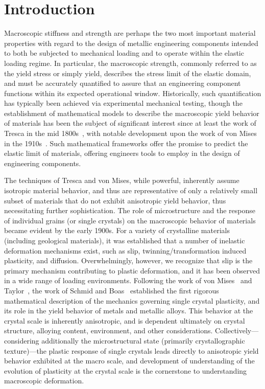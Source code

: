 \documentclass[preprint,3p,times,sort&compress,letterpaper,12pt]{elsarticle} %
\begin{document}

\section{Introduction}
\label{sec:introduction}

Macroscopic stiffness and strength are perhaps the two most important material properties with regard to the design of metallic engineering components intended to both be subjected to mechanical loading and to operate within the elastic loading regime. In particular, the macroscopic strength, commonly referred to as the yield stress or simply yield, describes the stress limit of the elastic domain, and must be accurately quantified to assure that an engineering component functions within its expected operational window. Historically, such quantification has typically been achieved via experimental mechanical testing, though the establishment of mathematical models to describe the macroscopic yield behavior of materials has been the subject of significant interest since at least the work of Tresca in the mid 1800s~\cite{Tresca}, with notable development upon the work of von Mises in the 1910s~\cite{Mises1913}. Such mathematical frameworks offer the promise to predict the elastic limit of materials, offering engineers tools to employ in the design of engineering components.

The techniques of Tresca and von Mises, while powerful, inherently assume isotropic material behavior, and thus are representative of only a relatively small subset of materials that do not exhibit anisotropic yield behavior, thus necessitating further sophistication. The role of microstructure and the response of individual grains (or single crystals) on the macroscopic behavior of materials became evident by the early 1900s. For a variety of crystalline materials (including geological materials), it was established that a number of inelastic deformation mechanisms exist, such as slip, twinning/transformation induced plasticity, and diffusion. Overwhelmingly, however, we recognize that slip is the primary mechanism contributing to plastic deformation, and it has been observed in a wide range of loading environments. Following the work of von Mises~\cite{Mises1928} and Taylor~\cite{Taylor1934a,Taylor1934b}, the work of Schmid and Boas~\cite{Schmid1935} established the first rigorous mathematical description of the mechanics governing single crystal plasticity, and its role in the yield behavior of metals and metallic alloys. This behavior at the crystal scale is inherently anisotropic, and is dependent ultimately on crystal structure, alloying content, environment, and other considerations. Collectively---considering additionally the microstructural state (primarily crystallographic texture)---the plastic response of single crystals leads directly to anisotropic yield behavior exhibited at the macro scale, and development of understanding of the evolution of plasticity at the crystal scale is the cornerstone to understanding macroscopic deformation.
\end{document}
